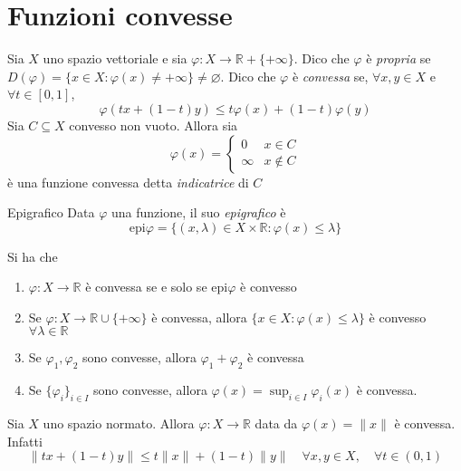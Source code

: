 \section{Funzioni convesse}
Sia \(X\) uno spazio vettoriale e sia \(\varphi : X \to \mathbb{R} + \{+ \infty\} \). Dico che \(\varphi \) è \emph{propria} se \(D{(\varphi )} = \{x \in X : \varphi {(x)} \neq +\infty\} \neq \varnothing\). Dico che \(\varphi \) è \emph{convessa} se, \(\forall x, y \in X\) e \(\forall t \in [0, 1]\), 
\[
  \varphi {(tx + {(1-t)}y)} \le t \varphi {(x)} + {(1-t)}\varphi {(y)}
\]
Sia \(C \subseteq X\) convesso non vuoto. Allora sia 
\[
  \varphi{(x)}= \begin{cases}{}
      0 & x \in C \\
      \infty & x \not\in  C
  \end{cases}
\]
è una funzione convessa detta \emph{indicatrice} di \(C\) 
\begin{definition}{Epigrafico}
    Data \(\varphi\) una funzione, il suo \emph{epigrafico} è
    \[
      \mathrm{epi}\varphi = \{{(x, \lambda)} \in X \times  \mathbb{R} : \varphi {(x)} \le \lambda\} 
    \]
\end{definition}
\begin{proposition}{}
    Si ha che
\begin{enumerate}[label = (\arabic*)]
    \item \(\varphi : X \to \mathbb{R}\) è convessa se e solo se \(\mathrm{epi}\varphi \) è convesso
    \item Se \(\varphi : X \to \mathbb{R} \cup \{+\infty\} \) è convessa, allora
        \(\{x \in X : \varphi {(x)} \le \lambda\} \) è convesso \(\forall \lambda \in \mathbb{R}\) 
    \item Se \(\varphi_{1}, \varphi_{2}\) sono convesse, allora
        \(\varphi_{1}+\varphi_{2}\) è convessa
    \item Se \(\{\varphi_{i}\}_{i \in I } \) sono convesse, allora \(\varphi{(x)} = \sup_{i \in I} \varphi_i {(x)}\) è convessa.
\end{enumerate}
\end{proposition}
\begin{example}{}
    Sia \(X\) uno spazio normato. Allora \(\varphi : X \to \mathbb{R}\) data da
    \(\varphi{(x)} = \|x\|\) è convessa. Infatti
\[
  \|tx + {(1-t)}y\| \le t \|x\| + {(1-t)}\|y\| \quad \forall x, y \in X, \quad
  \forall t \in (0, 1)
\]
\end{example}

